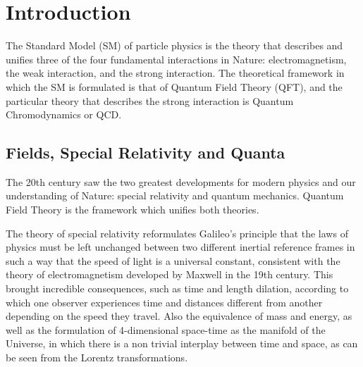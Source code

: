 \chapter*{Introduction}


\label{ch_introduction}


The Standard Model (SM) of particle physics is the theory that describes and unifies three of the four fundamental interactions in Nature: electromagnetism, the weak interaction, and the strong interaction. The theoretical framework in which the SM is formulated is that of Quantum Field Theory (QFT), and the particular theory that describes the strong interaction is Quantum Chromodynamics or QCD.

\section*{Fields, Special Relativity and Quanta}

The 20th century saw the two greatest developments for modern physics and our understanding of Nature: special relativity and quantum mechanics. Quantum Field Theory is the framework which unifies both theories. 

The theory of special relativity reformulates Galileo's principle that the laws of physics must be left unchanged between two different inertial reference frames in such a way that the speed of light is a universal constant, consistent with the theory of electromagnetism developed by Maxwell in the 19th century. This brought incredible consequences, such as time and length dilation, according to which one observer experiences time and distances different from another depending on the speed they travel. Also the equivalence of mass and energy, as well as the formulation of 4-dimensional space-time as the manifold of the Universe, in which there is a non trivial interplay between time and space, as can be seen from the Lorentz transformations.

